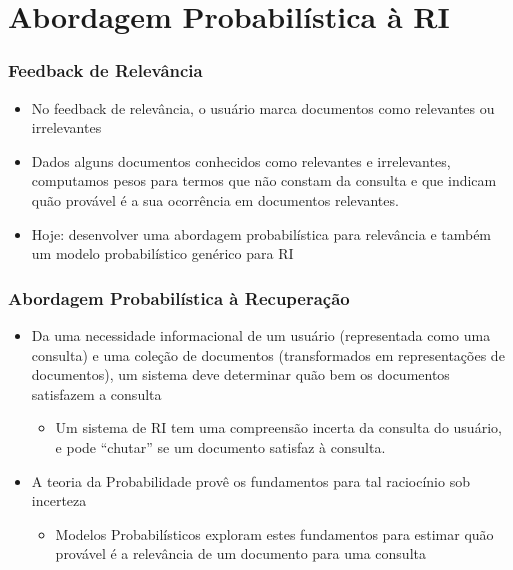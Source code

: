 \documentclass[compress]{beamer}
\def\myblue#1{\textcolor{texblue}{#1}}
\begin{document}
\section{Abordagem Probabilística à RI}
\begin{frame}[<+->]
\frametitle{Feedback de Relevância}
\pause[2]
\begin{itemize}

\item No feedback de relevância, o usuário marca documentos como relevantes ou irrelevantes

\item Dados alguns documentos conhecidos como relevantes e irrelevantes, computamos pesos para termos que não constam da consulta e que indicam quão provável é a sua ocorrência em documentos relevantes.

\item Hoje: desenvolver uma abordagem probabilística para relevância e também um modelo probabilístico genérico para RI
\end{itemize}
\end{frame}

\begin{frame}[<+->]
\frametitle{Abordagem Probabilística à Recuperação}
\pause[2]


\begin{itemize}
\item Da uma necessidade informacional de um usuário (representada como uma consulta) e uma coleção de documentos (transformados em representações de documentos), um sistema deve determinar quão bem os documentos satisfazem a consulta
\begin{itemize}

\item  Um sistema de RI tem uma \myblue{compreensão incerta} da consulta do usuário, e pode \myblue{``chutar''} se um documento satisfaz à consulta. 
\end{itemize}

\item A teoria da Probabilidade provê os fundamentos para tal \myblue{raciocínio sob incerteza} 
\begin{itemize}
\item Modelos Probabilísticos exploram estes fundamentos para estimar quão provável  é a relevância de um documento para uma consulta
\end{itemize}
\end{itemize}
\end{frame}
\end{document}
